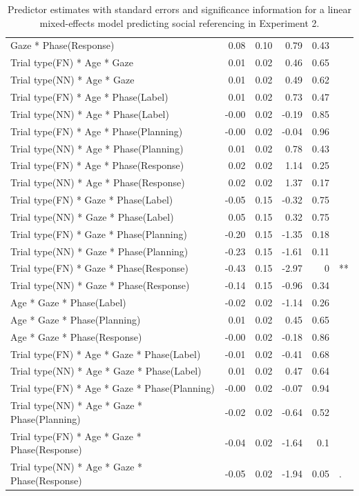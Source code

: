 \documentclass[a4paper,man,apacite,floatsintext]{apa6}
\begin{document}
\begin{table}[b]
\begin{tabular}{lrrrrl}
  Gaze * Phase(Response) & 0.08 & 0.10 & 0.79 & 0.43 &  \\ 
  Trial type(FN) * Age * Gaze & 0.01 & 0.02 & 0.46 & 0.65 &  \\ 
  Trial type(NN) * Age * Gaze & 0.01 & 0.02 & 0.49 & 0.62 &  \\ 
  Trial type(FN) * Age * Phase(Label) & 0.01 & 0.02 & 0.73 & 0.47 &  \\ 
  Trial type(NN) * Age * Phase(Label) & -0.00 & 0.02 & -0.19 & 0.85 &  \\ 
  Trial type(FN) * Age * Phase(Planning) & -0.00 & 0.02 & -0.04 & 0.96 &  \\ 
  Trial type(NN) * Age * Phase(Planning) & 0.01 & 0.02 & 0.78 & 0.43 &  \\ 
  Trial type(FN) * Age * Phase(Response) & 0.02 & 0.02 & 1.14 & 0.25 &  \\ 
  Trial type(NN) * Age * Phase(Response) & 0.02 & 0.02 & 1.37 & 0.17 &  \\ 
  Trial type(FN) * Gaze * Phase(Label) & -0.05 & 0.15 & -0.32 & 0.75 &  \\ 
  Trial type(NN) * Gaze * Phase(Label) & 0.05 & 0.15 & 0.32 & 0.75 &  \\ 
  Trial type(FN) * Gaze * Phase(Planning) & -0.20 & 0.15 & -1.35 & 0.18 &  \\ 
  Trial type(NN) * Gaze * Phase(Planning) & -0.23 & 0.15 & -1.61 & 0.11 &  \\ 
  Trial type(FN) * Gaze * Phase(Response) & -0.43 & 0.15 & -2.97 & 0 & ** \\ 
  Trial type(NN) * Gaze * Phase(Response) & -0.14 & 0.15 & -0.96 & 0.34 &  \\ 
  Age * Gaze * Phase(Label) & -0.02 & 0.02 & -1.14 & 0.26 &  \\ 
  Age * Gaze * Phase(Planning) & 0.01 & 0.02 & 0.45 & 0.65 &  \\ 
  Age * Gaze * Phase(Response) & -0.00 & 0.02 & -0.18 & 0.86 &  \\ 
  Trial type(FN) * Age * Gaze * Phase(Label) & -0.01 & 0.02 & -0.41 & 0.68 &  \\ 
  Trial type(NN) * Age * Gaze * Phase(Label) & 0.01 & 0.02 & 0.47 & 0.64 &  \\ 
  Trial type(FN) * Age * Gaze * Phase(Planning) & -0.00 & 0.02 & -0.07 & 0.94 &  \\ 
  Trial type(NN) * Age * Gaze * Phase(Planning) & -0.02 & 0.02 & -0.64 & 0.52 &  \\ 
  Trial type(FN) * Age * Gaze * Phase(Response) & -0.04 & 0.02 & -1.64 & 0.1 &  \\ 
  Trial type(NN) * Age * Gaze * Phase(Response) & -0.05 & 0.02 & -1.94 & 0.05 & . \\ 
   \hline
\end{tabular}
\caption{Predictor estimates with standard errors and significance information for a linear mixed-effects model predicting social referencing in Experiment 2.} 
\label{tab:exp2_reg}
\end{table}
\end{document}
